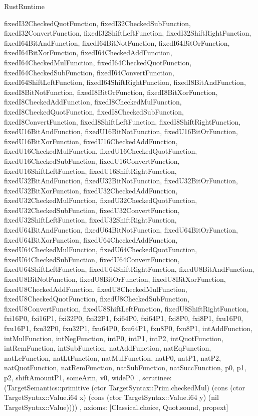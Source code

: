 \begin{lexlean}{RustRuntime}
\begin{semanticmodule}
{{      fixedI32CheckedQuotFunction,
      fixedI32CheckedSubFunction,
      fixedI32ConvertFunction,
      fixedI32ShiftLeftFunction,
      fixedI32ShiftRightFunction,
      fixedI64BitAndFunction,
      fixedI64BitNotFunction,
      fixedI64BitOrFunction,
      fixedI64BitXorFunction,
      fixedI64CheckedAddFunction,
      fixedI64CheckedMulFunction,
      fixedI64CheckedQuotFunction,
      fixedI64CheckedSubFunction,
      fixedI64ConvertFunction,
      fixedI64ShiftLeftFunction,
      fixedI64ShiftRightFunction,
      fixedI8BitAndFunction,
      fixedI8BitNotFunction,
      fixedI8BitOrFunction,
      fixedI8BitXorFunction,
      fixedI8CheckedAddFunction,
      fixedI8CheckedMulFunction,
      fixedI8CheckedQuotFunction,
      fixedI8CheckedSubFunction,
      fixedI8ConvertFunction,
      fixedI8ShiftLeftFunction,
      fixedI8ShiftRightFunction,
      fixedU16BitAndFunction,
      fixedU16BitNotFunction,
      fixedU16BitOrFunction,
      fixedU16BitXorFunction,
      fixedU16CheckedAddFunction,
      fixedU16CheckedMulFunction,
      fixedU16CheckedQuotFunction,
      fixedU16CheckedSubFunction,
      fixedU16ConvertFunction,
      fixedU16ShiftLeftFunction,
      fixedU16ShiftRightFunction,
      fixedU32BitAndFunction,
      fixedU32BitNotFunction,
      fixedU32BitOrFunction,
      fixedU32BitXorFunction,
      fixedU32CheckedAddFunction,
      fixedU32CheckedMulFunction,
      fixedU32CheckedQuotFunction,
      fixedU32CheckedSubFunction,
      fixedU32ConvertFunction,
      fixedU32ShiftLeftFunction,
      fixedU32ShiftRightFunction,
      fixedU64BitAndFunction,
      fixedU64BitNotFunction,
      fixedU64BitOrFunction,
      fixedU64BitXorFunction,
      fixedU64CheckedAddFunction,
      fixedU64CheckedMulFunction,
      fixedU64CheckedQuotFunction,
      fixedU64CheckedSubFunction,
      fixedU64ConvertFunction,
      fixedU64ShiftLeftFunction,
      fixedU64ShiftRightFunction,
      fixedU8BitAndFunction,
      fixedU8BitNotFunction,
      fixedU8BitOrFunction,
      fixedU8BitXorFunction,
      fixedU8CheckedAddFunction,
      fixedU8CheckedMulFunction,
      fixedU8CheckedQuotFunction,
      fixedU8CheckedSubFunction,
      fixedU8ConvertFunction,
      fixedU8ShiftLeftFunction,
      fixedU8ShiftRightFunction,
      fxi16P0,
      fxi16P1,
      fxi32P0,
      fxi32P1,
      fxi64P0,
      fxi64P1,
      fxi8P0,
      fxi8P1,
      fxu16P0,
      fxu16P1,
      fxu32P0,
      fxu32P1,
      fxu64P0,
      fxu64P1,
      fxu8P0,
      fxu8P1,
      intAddFunction,
      intMulFunction,
      intNegFunction,
      intP0,
      intP1,
      intP2,
      intQuotFunction,
      intRemFunction,
      intSubFunction,
      natAddFunction,
      natEqFunction,
      natLeFunction,
      natLtFunction,
      natMulFunction,
      natP0,
      natP1,
      natP2,
      natQuotFunction,
      natRemFunction,
      natSubFunction,
      natSuccFunction,
      p0,
      p1,
      p2,
      shiftAmountP1,
      someArm,
      v0,
      wideP0
    ],
    scrutinee: (TargetSemantics::primitive (ctor TargetSyntax::Prim.checkedMul) (cons (ctor TargetSyntax::Value.i64 x) (cons (ctor TargetSyntax::Value.i64 y) (nil TargetSyntax::Value))))
  },
  axioms: [Classical.choice, Quot.sound, propext]
}


\end{semanticmodule}
\end{lexlean}
